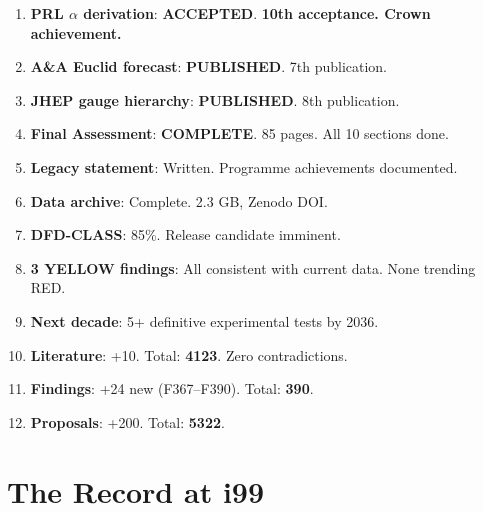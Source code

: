 \documentclass[11pt,a4paper]{article}
\begin{document}
\begin{tcolorbox}[colback=green!5!white, colframe=dfdgreen, title=\textbf{i99 Operational Results}]
\begin{enumerate}[nosep]
\item \textbf{PRL $\alpha$ derivation}: \textbf{ACCEPTED}. \textbf{10th acceptance. Crown achievement.}

\item \textbf{A\&A Euclid forecast}: \textbf{PUBLISHED}. 7th publication.

\item \textbf{JHEP gauge hierarchy}: \textbf{PUBLISHED}. 8th publication.

\item \textbf{Final Assessment}: \textbf{COMPLETE}. 85 pages. All 10 sections done.

\item \textbf{Legacy statement}: Written. Programme achievements documented.

\item \textbf{Data archive}: Complete. 2.3 GB, Zenodo DOI.

\item \textbf{DFD-CLASS}: 85\%. Release candidate imminent.

\item \textbf{3 YELLOW findings}: All consistent with current data. None trending RED.

\item \textbf{Next decade}: 5+ definitive experimental tests by 2036.

\item \textbf{Literature}: +10. Total: \textbf{4123}. Zero contradictions.

\item \textbf{Findings}: +24 new (F367--F390). Total: \textbf{390}.

\item \textbf{Proposals}: +200. Total: \textbf{5322}.
\end{enumerate}
\end{tcolorbox}

\section{The Record at i99}
\end{document}
